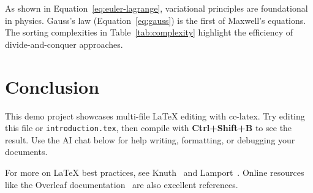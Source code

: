 \documentclass[11pt, a4paper]{article}
\begin{document}
As shown in Equation~\ref{eq:euler-lagrange}, variational principles are
foundational in physics. Gauss's law (Equation~\ref{eq:gauss}) is the first
of Maxwell's equations. The sorting complexities in Table~\ref{tab:complexity}
highlight the efficiency of divide-and-conquer approaches.

\section{Conclusion}

This demo project showcases multi-file \LaTeX{} editing with cc-latex.
Try editing this file or \texttt{introduction.tex}, then compile with
\textbf{Ctrl+Shift+B} to see the result. Use the AI chat below for help
writing, formatting, or debugging your documents.

For more on \LaTeX{} best practices, see Knuth~\cite{knuth1984} and
Lamport~\cite{lamport1994}. Online resources like the Overleaf
documentation~\cite{overleaf2024} are also excellent references.



\end{document}
